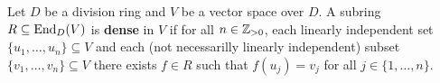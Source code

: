 %
%



\begin{definition}
	Let $D$ be a division ring and $V$ be a vector space over $D$. A subring 
	$R\subseteq\operatorname{End}_D(V)$ is \textbf{dense} in $V$ if for all  
	$n\in\mathbb{Z}_{>0}$, each linearly independent set $\{u_1,\dots,u_n\}\subseteq V$ 
	and each (not necessarilly linearly independent) subset $\{v_1,\dots,v_n\}\subseteq V$ 
	there exists $f\in R$ such that $f(u_j)=v_j$ for all 
	$j\in\{1,\dots,n\}$.
\end{definition}

